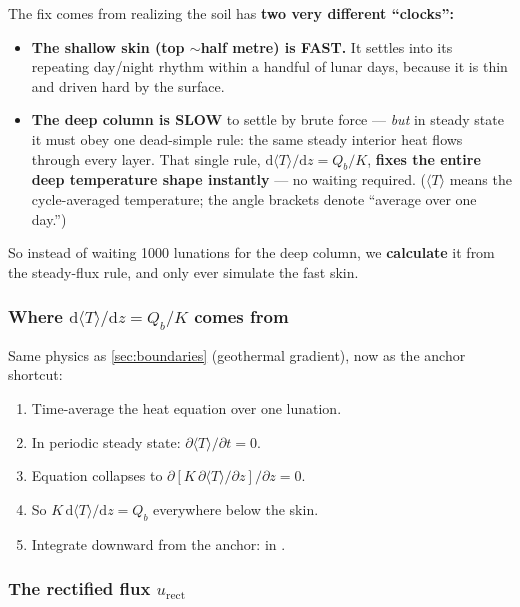 The fix comes from realizing the soil has \textbf{two very different ``clocks'':}
\begin{itemize}[leftmargin=1.4em,itemsep=3pt]
  \item \textbf{The shallow skin (top ${\sim}$half metre) is FAST.} It settles
    into its repeating day/night rhythm within a handful of lunar days, because
    it is thin and driven hard by the surface.
  \item \textbf{The deep column is SLOW} to settle by brute force --- \emph{but}
    in steady state it must obey one dead-simple rule: the same steady interior
    heat \Qb{} flows through every layer. That single rule,
    $\mathrm{d}\langle T\rangle/\mathrm{d}z = Q_b/K$, \textbf{fixes the entire
    deep temperature shape instantly} --- no waiting required. ($\langle T\rangle$
    means the cycle-averaged temperature; the angle brackets denote ``average
    over one day.'')
\end{itemize}
So instead of waiting 1000 lunations for the deep column, we \textbf{calculate}
it from the steady-flux rule, and only ever simulate the fast skin.

\subsubsection{Where $\mathrm{d}\langle T\rangle/\mathrm{d}z = Q_b/K$ comes from}

Same physics as \autoref{sec:boundaries} (geothermal gradient), now as the
anchor shortcut:
\begin{enumerate}[leftmargin=1.5em,itemsep=2pt]
  \item Time-average the heat equation over one lunation.
  \item In periodic steady state: $\partial\langle T\rangle/\partial t=0$.
  \item Equation collapses to $\partial[K\,\partial\langle T\rangle/\partial z]/\partial z=0$.
  \item So $K\,\mathrm{d}\langle T\rangle/\mathrm{d}z=Q_b$ everywhere below the skin.
  \item Integrate downward from the anchor:  in
    .
\end{enumerate}

\subsubsection{The rectified flux $u_{\mathrm{rect}}$}

